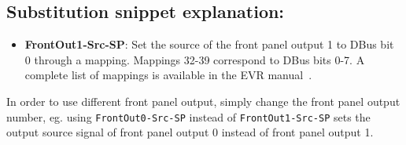 \documentclass[12pt,a4paper]{article}
\begin{document}
\subsection{Substitution snippet explanation:}
\begin{itemize}
	\item \textbf{FrontOut1-Src-SP}: Set the source of the front panel output 1  to DBus bit 0 through a mapping. Mappings 32-39 correspond to DBus bits 0-7. A complete list of mappings is available in the EVR manual~\cite{evr_manual}.
\end{itemize}

In order to use different front panel output, simply change the front panel output number, eg. using \texttt{FrontOut0-Src-SP} instead of \texttt{FrontOut1-Src-SP} sets the output source signal of front panel output 0 instead of front panel output 1.



\end{document}
